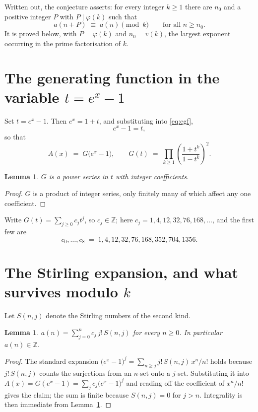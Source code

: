 \documentclass[11pt,a4paper]{article}
\theoremstyle{plain}
\newtheorem{lemma}[theorem]{Lemma}
\theoremstyle{definition}
\begin{document}
Written out, the conjecture asserts: for every integer $k\ge 1$ there are $n_0$ and a
positive integer $P$ with $P\mid\varphi(k)$ such that
\begin{equation}\label{eq:conj}
a(n+P)\;\equiv\;a(n)\pmod{k}\qquad\text{for all } n\ge n_0 .
\end{equation}
It is proved below, with $P=\varphi(k)$ and $n_0=v(k)$, the largest exponent occurring in
the prime factorisation of $k$.

\section{The generating function in the variable $t=e^{x}-1$}

Set $t=e^{x}-1$. Then $e^{x}=1+t$, and substituting into \eqref{eq:egf},
\[
e^{x}-1=t,
\]
so that
\begin{equation}\label{eq:G}
A(x)\;=\;G\bigl(e^{x}-1\bigr),\qquad
G(t)\;=\;\prod_{k\ge 1}\left(\frac{1+t^{k}}{1-t^{k}}\right)^{2}.
\end{equation}

\begin{lemma}\label{lem:int}
$G$ is a power series in $t$ with integer coefficients.
\end{lemma}

\begin{proof}
$G$ is a product of integer series, only finitely many of which affect any one coefficient.
\end{proof}

Write $G(t)=\sum_{j\ge0}c_j t^{j}$, so $c_j\in\mathbb{Z}$; here $c_j = 1, 4, 12, 32, 76, 168, \dots$, and the
first few are
\[
c_0,\dots,c_8 \;=\; 1, 4, 12, 32, 76, 168, 352, 704, 1356.
\]

\section{The Stirling expansion, and what survives modulo $k$}

Let $S(n,j)$ denote the Stirling numbers of the second kind.

\begin{lemma}\label{lem:stir}
$a(n)=\sum_{j=0}^{n} c_j\, j!\, S(n,j)$ for every $n\ge 0$. In particular $a(n)\in\mathbb{Z}$.
\end{lemma}

\begin{proof}
The standard expansion $\bigl(e^{x}-1\bigr)^{j}
=\sum_{n\ge j} j!\,S(n,j)\,x^{n}/n!$ holds because $j!\,S(n,j)$ counts the surjections
from an $n$-set onto a $j$-set. Substituting it into
$A(x)=G(e^{x}-1)=\sum_j c_j\bigl(e^{x}-1\bigr)^{j}$ and reading off the coefficient of
$x^{n}/n!$ gives the claim; the sum is finite because $S(n,j)=0$ for $j>n$. Integrality is
then immediate from Lemma~\ref{lem:int}.
\end{proof}
\end{document}
